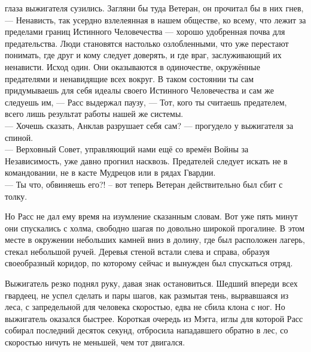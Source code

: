 глаза выжигателя сузились. Загляни бы туда Ветеран, он прочитал бы в них гнев, 
--- Ненависть, так усердно взлелеянная в нашем обществе, ко всему, что лежит за 
пределами границ Истинного Человечества --- хорошо удобренная почва для 
предательства. Люди становятся настолько озлобленными, что уже перестают 
понимать, где друг и кому следует доверять, и где враг, заслуживающий их 
ненависти. Исход один. Они оказываются в одиночестве, окружённые предателями и 
ненавидящие всех вокруг. В таком состоянии ты сам придумываешь для себя идеалы 
своего Истинного Человечества и сам же следуешь им, --- Расс выдержал паузу, 
--- Тот, кого ты считаешь предателем, всего лишь результат работы нашей же 
системы.\\
--- Хочешь сказать, Анклав разрушает себя сам? --- прогудело у выжигателя за 
спиной.\\
--- Верховный Совет, управляющий нами ещё со времён Войны за Независимость, уже 
давно прогнил насквозь. Предателей следует искать не в командовании, не в касте 
Мудрецов или в рядах Гвардии.\\
--- Ты что, обвиняешь его?! – вот теперь Ветеран действительно был сбит с толку.

Но Расс не дал ему время на изумление сказанным словам. Вот уже пять минут они 
спускались с холма, свободно шагая по довольно широкой прогалине. В этом месте в 
окружении небольших камней вниз в долину, где был расположен лагерь, стекал 
небольшой ручей. Деревья стеной встали слева и справа, образуя своеобразный 
коридор, по которому сейчас и вынужден был спускаться отряд.    

Выжигатель резко поднял руку, давая знак остановиться. Шедший впереди всех 
гвардеец, не успел сделать и пары шагов, как размытая тень, вырвавшаяся из леса, 
с запредельной для человека скоростью, едва не сбила клона с ног. Но выжигатель 
оказался быстрее. Короткая очередь из Мэгга, иглы для которой Расс собирал 
последний десяток секунд, отбросила нападавшего обратно в лес, со скоростью 
ничуть не меньшей, чем тот двигался.

